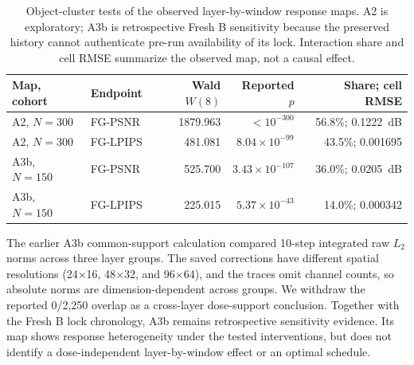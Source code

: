 \documentclass[times,twocolumn,final]{elsarticle}
\providecommand{\DIFadd}[1]{{\protect\color{blue} \sf #1}} %
\providecommand{\DIFaddbegin}{} %
\providecommand{\DIFaddend}{} %
\providecommand{\DIFaddFL}[1]{\DIFadd{#1}} %
\providecommand{\DIFaddbeginFL}{\DIFaddbegin} %
\providecommand{\DIFaddendFL}{\DIFaddend} %
\renewcommand{\DIFaddbeginFL}{}
\renewcommand{\DIFaddendFL}{}
\renewcommand{\DIFaddFL}[1]{#1}
\begin{document}
\begin{table}[t]
\centering
  \DIFaddbeginFL \scriptsize
\setlength{\tabcolsep}{3pt}
\caption{Object-cluster tests of the observed layer-by-window response maps. A2 is exploratory; A3b is retrospective Fresh B sensitivity because the preserved history cannot authenticate pre-run availability of its lock. Interaction share and cell RMSE summarize the observed map, not a causal effect.}
\label{tab:layerwindow-main}
\begin{tabular}{llrrr}
\DIFaddendFL \toprule
  \DIFaddbeginFL \DIFaddFL{Map, cohort }\DIFaddendFL &   \DIFaddbeginFL \DIFaddFL{Endpoint }\DIFaddendFL &   \DIFaddbeginFL \DIFaddFL{Wald $W(8)$ }\DIFaddendFL &   \DIFaddbeginFL \DIFaddFL{Reported $p$ }\DIFaddendFL &   \DIFaddbeginFL \DIFaddFL{Share; cell RMSE }\DIFaddendFL \\
\midrule
  \DIFaddbeginFL \DIFaddFL{A2, $N=300$ }\DIFaddendFL &   \DIFaddbeginFL \DIFaddFL{FG-PSNR }\DIFaddendFL &   \DIFaddbeginFL \DIFaddFL{1879.963 }\DIFaddendFL &   \DIFaddbeginFL \DIFaddFL{$<10^{-300}$ }\DIFaddendFL &   \DIFaddbeginFL \DIFaddFL{56.8\%; 0.1222~dB }\DIFaddendFL \\
  \DIFaddbeginFL \DIFaddFL{A2, $N=300$ }\DIFaddendFL &   \DIFaddbeginFL \DIFaddFL{FG-LPIPS }\DIFaddendFL &   \DIFaddbeginFL \DIFaddFL{481.081 }\DIFaddendFL &   \DIFaddbeginFL \DIFaddFL{$8.04\times10^{-99}$ }\DIFaddendFL &   \DIFaddbeginFL \DIFaddFL{43.5\%; 0.001695 }\DIFaddendFL \\
  \DIFaddbeginFL \DIFaddFL{A3b, $N=150$ }\DIFaddendFL &   \DIFaddbeginFL \DIFaddFL{FG-PSNR }\DIFaddendFL &   \DIFaddbeginFL \DIFaddFL{525.700 }\DIFaddendFL &   \DIFaddbeginFL \DIFaddFL{$3.43\times10^{-107}$ }\DIFaddendFL &   \DIFaddbeginFL \DIFaddFL{36.0\%; 0.0205~dB }\\
\DIFaddFL{A3b, $N=150$ }& \DIFaddFL{FG-LPIPS }& \DIFaddFL{225.015 }& \DIFaddFL{$5.37\times10^{-43}$ }& \DIFaddFL{14.0\%; 0.000342 }\DIFaddendFL \\
\bottomrule
\end{tabular}
\end{table}

  \DIFaddbegin \DIFadd{The earlier A3b common-support calculation compared 10-step integrated raw $L_2$ norms across three layer groups. The saved corrections have different spatial resolutions (24$\times$16, 48$\times$32, and 96$\times$64), and the traces omit channel counts, so absolute norms are dimension-dependent across groups. We withdraw the reported 0/2,250 overlap as a cross-layer dose-support conclusion. Together with the Fresh B lock chronology, A3b remains retrospective sensitivity evidence. Its map shows response heterogeneity under the tested interventions, but does not identify a dose-independent layer-by-window effect or an optimal schedule.
}
\end{document}
